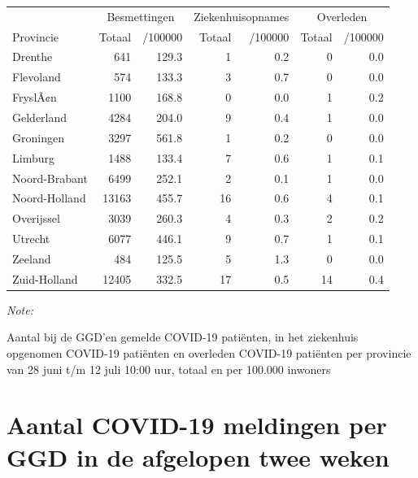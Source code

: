 \documentclass[
  english,
  man,floatsintext]{apa6}
\begin{document}
\begin{table}
\centering
\begin{threeparttable}
\begin{tabular}{lrrrrrr}
\toprule
\multicolumn{1}{c}{ } & \multicolumn{2}{c}{Besmettingen} & \multicolumn{2}{c}{Ziekenhuisopnames} & \multicolumn{2}{c}{Overleden} \\
\cmidrule(l{3pt}r{3pt}){2-3} \cmidrule(l{3pt}r{3pt}){4-5} \cmidrule(l{3pt}r{3pt}){6-7}
Provincie & Totaal & /100000 & Totaal & /100000 & Totaal & /100000\\
\midrule
Drenthe & 641 & 129.3 & 1 & 0.2 & 0 & 0.0\\
Flevoland & 574 & 133.3 & 3 & 0.7 & 0 & 0.0\\
FryslÃ¢n & 1100 & 168.8 & 0 & 0.0 & 1 & 0.2\\
Gelderland & 4284 & 204.0 & 9 & 0.4 & 1 & 0.0\\
Groningen & 3297 & 561.8 & 1 & 0.2 & 0 & 0.0\\
Limburg & 1488 & 133.4 & 7 & 0.6 & 1 & 0.1\\
Noord-Brabant & 6499 & 252.1 & 2 & 0.1 & 1 & 0.0\\
Noord-Holland & 13163 & 455.7 & 16 & 0.6 & 4 & 0.1\\
Overijssel & 3039 & 260.3 & 4 & 0.3 & 2 & 0.2\\
Utrecht & 6077 & 446.1 & 9 & 0.7 & 1 & 0.1\\
Zeeland & 484 & 125.5 & 5 & 1.3 & 0 & 0.0\\
Zuid-Holland & 12405 & 332.5 & 17 & 0.5 & 14 & 0.4\\
\bottomrule
\end{tabular}
\begin{tablenotes}
\item \textit{Note: } 
\item Aantal bij de GGD’en gemelde COVID-19 patiënten, in het ziekenhuis opgenomen COVID-19 patiënten en overleden COVID-19 patiënten per provincie van 28 juni t/m 12 juli 10:00 uur, totaal en per 100.000 inwoners
\end{tablenotes}
\end{threeparttable}
\end{table}

\newpage

\hypertarget{aantal-covid-19-meldingen-per-ggd-in-de-afgelopen-twee-weken}{%
\section{Aantal COVID-19 meldingen per GGD in de afgelopen twee weken}\label{aantal-covid-19-meldingen-per-ggd-in-de-afgelopen-twee-weken}}
\end{document}
